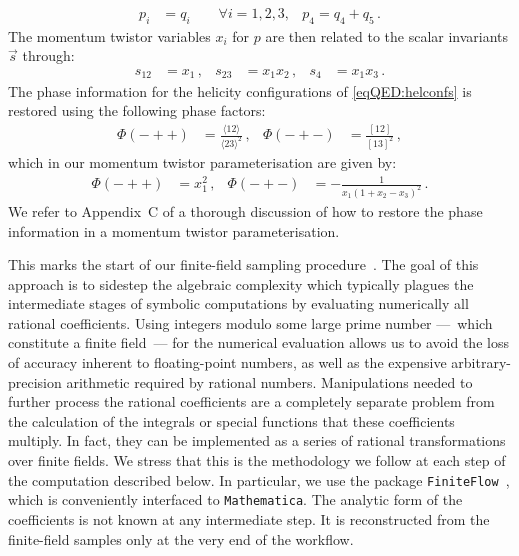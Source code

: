 \documentclass[main.tex]{subfiles}
\begin{document}
\begin{align}
    p_i &= q_i \qquad \forall i=1,2,3, & p_4=q_4+q_5 \, .
\end{align}
The momentum twistor variables $x_i$ for $p$ are then related to the scalar invariants $\vec{s}$ through:
\begin{align} \label{eqQED:mtvs}
    s_{12} &= x_1 \,, &
    s_{23} &= x_1 x_2 \,, &
    s_4 &= x_1 x_3 \,.
\end{align}
The phase information for the helicity configurations of \cref{eqQED:helconfs} is restored using the following phase factors: 
\begin{align}
  \Phi(-++) &= \frac{\langle 1 2 \rangle}{\langle 2 3 \rangle^2} \,,&
  \Phi(-+-) &= \frac{[ 1 2 ]}{[ 1 3 ]^2} \,,
\end{align}
which in our momentum twistor parameterisation are given by:
\begin{align}
  \Phi(-++) &= x_1^2 \,,&
  \Phi(-+-) &= - \frac{1}{x_1 (1 + x_2 - x_3)^2}   \,.
\end{align}
We refer to Appendix~C of  a thorough discussion of how to restore the phase information in a momentum twistor parameterisation.

This marks the start of our finite-field sampling
procedure~\cite{Peraro:2016wsq}.  The goal of this approach is to sidestep the
algebraic complexity which typically plagues the intermediate stages of
symbolic computations by evaluating numerically all rational coefficients.
Using integers modulo some large prime number ---~which constitute a finite
field~--- for the numerical evaluation allows us to avoid the loss of accuracy
inherent to floating-point numbers, as well as the expensive
arbitrary-precision arithmetic required by rational numbers.  Manipulations
needed to further process the rational coefficients are a completely separate
problem from the calculation of the integrals or special functions that these
coefficients multiply. In fact, they can be implemented as a series of rational
transformations over finite fields. We stress that this is the methodology we
follow at each step of the computation described below. In particular, we use
the package \texttt{FiniteFlow}~\cite{Peraro:2019svx}, which is conveniently
interfaced to \texttt{Mathematica}. The analytic form of the coefficients is
not known at any intermediate step. It is reconstructed from the finite-field
samples only at the very end of the workflow.
\end{document}
